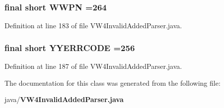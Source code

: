 \subsubsection[{W\+W\+P\+N}]{\setlength{\rightskip}{0pt plus 5cm}final short W\+W\+P\+N =264\hspace{0.3cm}{\ttfamily [static]}}\label{classorg_1_1smallfoot_1_1parser_1_1zone_1_1VW4InvalidAddedParser_ab9a3de9a217cad4ad00a26e6324f275e}


Definition at line 183 of file V\+W4\+Invalid\+Added\+Parser.\+java.

\subsubsection[{Y\+Y\+E\+R\+R\+C\+O\+D\+E}]{\setlength{\rightskip}{0pt plus 5cm}final short Y\+Y\+E\+R\+R\+C\+O\+D\+E =256\hspace{0.3cm}{\ttfamily [static]}}\label{classorg_1_1smallfoot_1_1parser_1_1zone_1_1VW4InvalidAddedParser_a1c58472ea6621d2f613831e08d10dba3}


Definition at line 187 of file V\+W4\+Invalid\+Added\+Parser.\+java.



The documentation for this class was generated from the following file\+:\begin{DoxyCompactItemize}
\item 
java/{\bf V\+W4\+Invalid\+Added\+Parser.\+java}\end{DoxyCompactItemize}

